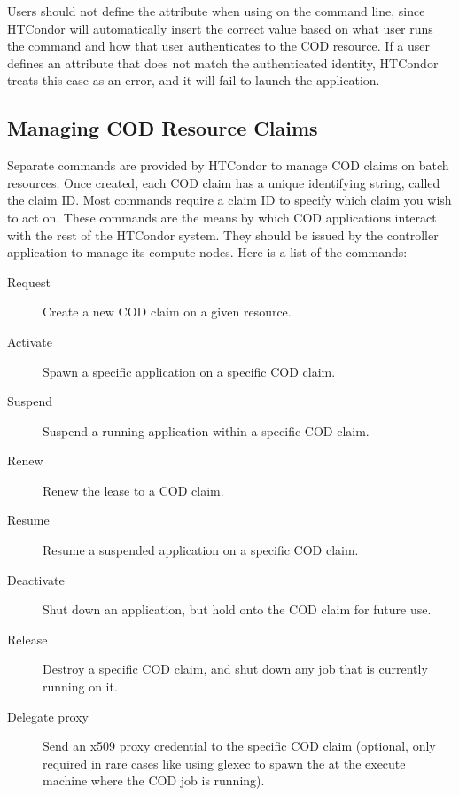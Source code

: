 \Note Users should not define the  attribute
when using   on the command line, since HTCondor
will automatically insert the correct value based on what user runs the
 command and how that user authenticates to the
COD resource.
If a user defines an attribute that does not match the authenticated
identity, HTCondor treats this case as an error, and it will fail to launch the
application.


\subsection{\label{sec:cod-managing-claims}
Managing COD Resource Claims}

Separate commands are provided by HTCondor to manage COD
claims on batch resources.
Once created, each COD claim has a unique identifying string, called the
claim ID.
Most commands require a claim ID to specify which claim you wish to
act on. 
These commands are the means by which COD applications interact with
the rest of the HTCondor system.
They should be issued by the controller application to manage its
compute nodes.
Here is a list of the commands:

\begin{description}

\item [Request] Create a new COD claim on a given resource.

\item [Activate] Spawn a specific application on a specific COD claim.

\item [Suspend] Suspend a running application within a specific COD claim.

\item [Renew] Renew the lease to a COD claim.

\item [Resume] Resume a suspended application on a specific COD claim.

\item [Deactivate] Shut down an application, but hold onto the COD claim
  for future use.

\item [Release] Destroy a specific COD claim, and shut down any job that is
  currently running on it.

\item [Delegate proxy] Send an x509 proxy credential to the specific
  COD claim (optional, only required in rare cases like using glexec
  to spawn the  at the execute machine where the COD
  job is running).

\end{description}

